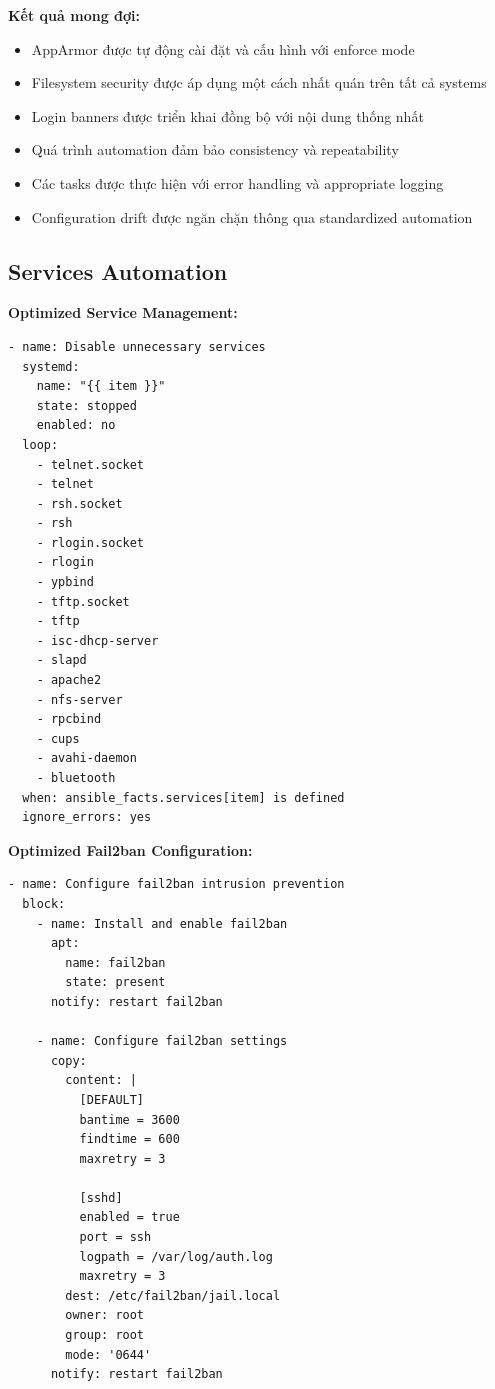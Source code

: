 \noindent \textbf{Kết quả mong đợi:}
\begin{itemize}
\item AppArmor được tự động cài đặt và cấu hình với enforce mode
\item Filesystem security được áp dụng một cách nhất quán trên tất cả systems
\item Login banners được triển khai đồng bộ với nội dung thống nhất
\item Quá trình automation đảm bảo consistency và repeatability
\item Các tasks được thực hiện với error handling và appropriate logging
\item Configuration drift được ngăn chặn thông qua standardized automation
\end{itemize}

\subsection{Services Automation}

\noindent \textbf{Optimized Service Management:}
\begin{verbatim}
- name: Disable unnecessary services
  systemd:
    name: "{{ item }}"
    state: stopped
    enabled: no
  loop:
    - telnet.socket
    - telnet
    - rsh.socket
    - rsh
    - rlogin.socket
    - rlogin
    - ypbind
    - tftp.socket
    - tftp
    - isc-dhcp-server
    - slapd
    - apache2
    - nfs-server
    - rpcbind
    - cups
    - avahi-daemon
    - bluetooth
  when: ansible_facts.services[item] is defined
  ignore_errors: yes
\end{verbatim}

\noindent \textbf{Optimized Fail2ban Configuration:}
\begin{verbatim}
- name: Configure fail2ban intrusion prevention
  block:
    - name: Install and enable fail2ban
      apt:
        name: fail2ban
        state: present
      notify: restart fail2ban

    - name: Configure fail2ban settings
      copy:
        content: |
          [DEFAULT]
          bantime = 3600
          findtime = 600
          maxretry = 3
          
          [sshd]
          enabled = true
          port = ssh
          logpath = /var/log/auth.log
          maxretry = 3
        dest: /etc/fail2ban/jail.local
        owner: root
        group: root
        mode: '0644'
      notify: restart fail2ban
\end{verbatim}

